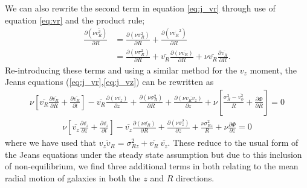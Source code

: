 We can also rewrite the second term in equation \ref{eq:j_vr} through use of equation \ref{eq:vr} and the product rule; 
\begin{align}
\frac{\partial ( \nu \overline{v_R^2})}{\partial R} &= \frac{\partial (\nu \sigma^2_R)}{\partial R} + \frac{\partial ( \nu \overline{v_R}^2)}{\partial R} \\
&= \frac{\partial (\nu \sigma^2_R)}{\partial R} +  \overline{v_R}\frac{\partial (\nu \overline{v_R})}{\partial R} + \nu \overline{v_R} \frac{\partial \overline{v_R}}{\partial R}.
\end{align}
Re-introducing these terms and using a similar method for the $v_z$ moment, the Jeans equations (\ref{eq:j_vr},\ref{eq:j_vz}) can be rewritten as
\begin{multline}
\nu \left[\overline{v_R}\frac{\partial \overline{v_R}}{\partial R} + \frac{\partial \overline{v_R}}{\partial t} \right] - \overline{v_R} \frac{\partial (\nu \overline{v_z})}{\partial z} + \frac{\partial (\nu \sigma_R^2)}{\partial R} + \frac{\partial (\nu \overline{v_R v_z})}{\partial z} + \nu \left[ \frac{\sigma_R^2 - \overline{v_{\phi}^2}}{R} + \frac{\partial \Phi}{\partial R}\right] = 0
\end{multline}
\begin{multline}
\nu \left[\overline{v_z}\frac{\partial \overline{v_z}}{\partial z} + \frac{\partial \overline{v_z}}{\partial t} \right] - \overline{v_z} \frac{\partial (\nu \overline{v_R})}{\partial R} + \frac{\partial (\nu \sigma_z^2)}{\partial z} + \frac{\nu \sigma_{Rz}^2}{R} + \nu \frac{\partial \Phi}{\partial z} = 0 
\end{multline}
where we have used that $\overline{v_z v_R} = \sigma_{Rz}^2 + \overline{v_R} \ \overline{v_z}$. These reduce to the usual form of the Jeans equations under the steady state assumption but due to this inclusion of non-equilibrium, we find three additional terms in both relating to the mean radial motion of galaxies in both the $z$ and $R$ directions. 

